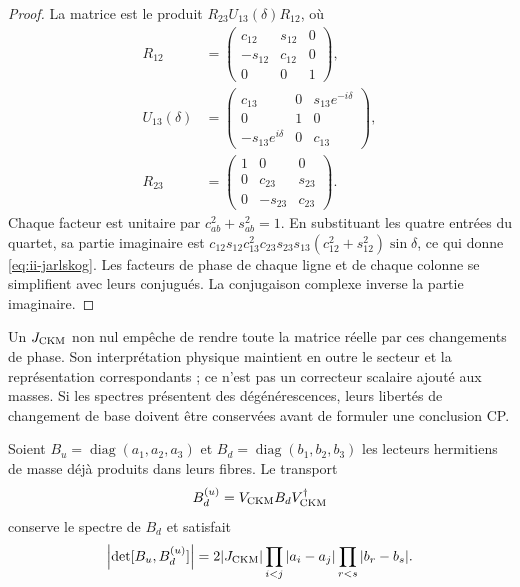 \begin{proof}
La matrice est le produit \(R_{23}U_{13}(\delta)R_{12}\), où
\begin{equation}
\begin{aligned}
 R_{12}&=\begin{pmatrix}c_{12}&s_{12}&0\\-s_{12}&c_{12}&0\\0&0&1\end{pmatrix},
 \\
 U_{13}(\delta)&=
 \begin{pmatrix}c_{13}&0&s_{13}e^{-i\delta}\\0&1&0\\
 -s_{13}e^{i\delta}&0&c_{13}\end{pmatrix},
 \\
 R_{23}&=\begin{pmatrix}1&0&0\\0&c_{23}&s_{23}\\0&-s_{23}&c_{23}\end{pmatrix}.
\end{aligned}
 \label{eq:ii-ckm-factorization}
\end{equation}
Chaque facteur est unitaire par \(c_{ab}^2+s_{ab}^2=1\).
En substituant les quatre entrées du quartet, sa partie imaginaire est
\(c_{12}s_{12}c_{13}^2c_{23}s_{23}s_{13}
(c_{12}^2+s_{12}^2)\sin\delta\), ce qui donne
\eqref{eq:ii-jarlskog}. Les facteurs de phase de chaque ligne et de chaque colonne
se simplifient avec leurs conjugués. La conjugaison complexe inverse la partie
imaginaire.
\end{proof}

Un \(J_{\rm CKM}\) non nul empêche de rendre toute la matrice réelle par
ces changements de phase. Son interprétation physique maintient en outre le secteur
et la représentation correspondants ; ce n'est pas un correcteur scalaire ajouté
aux masses. Si les spectres présentent des dégénérescences, leurs libertés de
changement de base doivent être conservées avant de formuler une conclusion CP.



\begin{samepage}
\begin{proposition}
Soient \(B_u=\operatorname{diag}(a_1,a_2,a_3)\) et
\(B_d=\operatorname{diag}(b_1,b_2,b_3)\) les lecteurs hermitiens de masse
déjà produits dans leurs fibres. Le transport
\begin{equation}
 B_d^{(u)}=V_{\rm CKM}B_dV_{\rm CKM}^{\dagger}
 \label{eq:ii-ckm-mass-transport}
\end{equation}
conserve le spectre de \(B_d\) et satisfait
\begin{equation}
 \left|\det[B_u,B_d^{(u)}]\right|
 =2|J_{\rm CKM}|
   \prod_{i<j}|a_i-a_j|\prod_{r<s}|b_r-b_s|.
 \label{eq:ii-ckm-commutator}
\end{equation}
\end{proposition}
\end{samepage}


